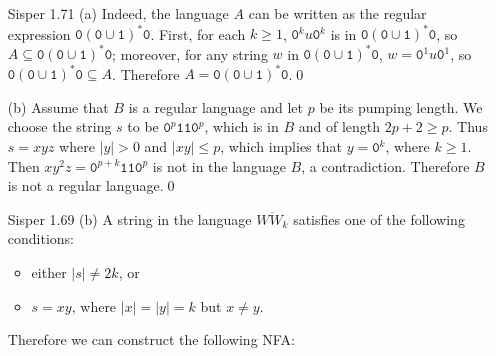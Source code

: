 \documentclass[12pt,a4paper]{ctexart}
\def\ling{\texttt{0}}
\def\yi{\texttt{1}}
\begin{document}
\begin{enumerate}
\item[Sisper 1.71](a) Indeed, the language $A$ can be written as the regular expression $\ling (\ling\cup\yi)^*\ling$. First, for each $k\ge 1$, $\ling^ku\ling^k$ is in $\ling (\ling\cup\yi)^*\ling$, so $A\subseteq \ling (\ling\cup\yi)^*\ling$; moreover, for any string $w$ in $\ling (\ling\cup\yi)^*\ling$, $w = \ling^1u\ling^1$, so $\ling (\ling\cup\yi)^*\ling\subseteq A$. Therefore $A = \ling (\ling\cup\yi)^*\ling$.\hfill\qed

(b) Assume that $B$ is a regular language and let $p$ be its pumping length. We choose the string $s$ to be $\ling^p\yi\yi\ling^p$, which is in $B$ and of length $2p+2\ge p$. Thus $s=xyz$ where $|y|>0$ and $|xy|\le p$, which implies that $y=\ling^k$, where $k\ge 1$. Then $xy^2z=\ling^{p+k}\yi\yi\ling^p$ is not in the language $B$, a contradiction. Therefore $B$ is not a regular language.\hfill\qed

\item[Sisper 1.69](b) A string in the language $\overline{WW_k}$ satisfies one of the following conditions:
\begin{itemize}
	\item either $|s|\ne 2k$, or
	\item $s = xy$, where $|x| = |y| = k$ but $x\ne y$.
\end{itemize}
\iffalse
Using the construction given in the proof that ``regular languages are closed under the union (intersection) operation", we can construct several \textsf{NFA}s and combine them into a new machine whose number of states is the product of its components.

First, we can construct an \textsf{NFA} that recognizes $\{s\mid |s|\ne 2k\}$ with $2k$ states; for strings that fall into the second category, there exists some $1\le i\le k$ such that $s_i\ne s_{i+k}$, that is, $s_i = \ling$ and $s_{i+k} = \yi$ or $s_i = \yi$ and $s_{i+k} = \ling$, so $4\sum\limits_{i=1}^k i\cdot (k+i) = O(k^3)$ states are needed. Combining the two categories with the union operation, we obtain an \textsf{NFA} that recognizes $\overline{WW_k}$ with $O(k^4)$ states, which is much smaller than $2^k$ for large $k$'s.
\fi
Therefore we can construct the following \textsf{NFA}:


\end{enumerate}
\end{document}
